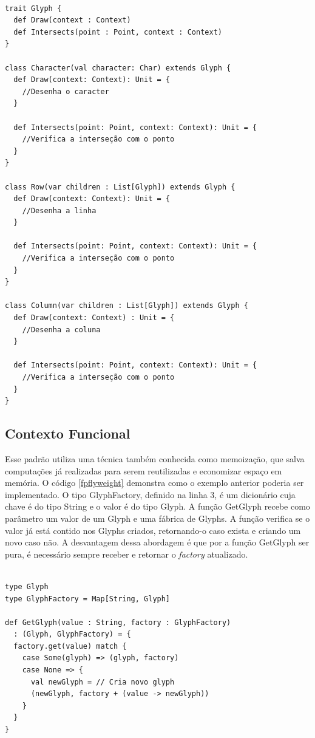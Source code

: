 \begin{lstlisting}[caption={Flyweight Orientado a Objetos},label=ooflyweight]

trait Glyph {
  def Draw(context : Context)
  def Intersects(point : Point, context : Context)
}

class Character(val character: Char) extends Glyph {
  def Draw(context: Context): Unit = {
    //Desenha o caracter
  }

  def Intersects(point: Point, context: Context): Unit = {
    //Verifica a interseção com o ponto
  }
}

class Row(var children : List[Glyph]) extends Glyph {
  def Draw(context: Context): Unit = {
    //Desenha a linha
  }

  def Intersects(point: Point, context: Context): Unit = {
    //Verifica a interseção com o ponto
  }
}

class Column(var children : List[Glyph]) extends Glyph {
  def Draw(context: Context) : Unit = {
    //Desenha a coluna
  }

  def Intersects(point: Point, context: Context): Unit = {
    //Verifica a interseção com o ponto
  }
}

\end{lstlisting}

\subsection*{Contexto Funcional}

Esse padrão utiliza uma técnica também conhecida 
como memoização, que salva computações já realizadas 
para serem reutilizadas e economizar espaço em 
memória\cite{scalafunctpatterns}. O código \ref{fpflyweight} 
demonstra como o exemplo anterior poderia ser 
implementado. O tipo GlyphFactory, definido na 
linha 3, é um dicionário cuja chave é do tipo 
String e o valor é do tipo Glyph. A função 
GetGlyph recebe como parâmetro um valor de um 
Glyph e uma fábrica de Glyphs. A função verifica 
se o valor já está contido nos Glyphs criados, 
retornando-o caso exista e criando um novo 
caso não. A desvantagem dessa abordagem é que 
por a função GetGlyph ser pura, é necessário 
sempre receber e retornar o \textit{factory} 
atualizado.

\begin{lstlisting}[caption={Flyweight Funcional},label=fpflyweight]
    
type Glyph
type GlyphFactory = Map[String, Glyph]

def GetGlyph(value : String, factory : GlyphFactory)
  : (Glyph, GlyphFactory) = {
  factory.get(value) match {
    case Some(glyph) => (glyph, factory)
    case None => {
      val newGlyph = // Cria novo glyph 
      (newGlyph, factory + (value -> newGlyph))
    }
  }
}
    
\end{lstlisting}